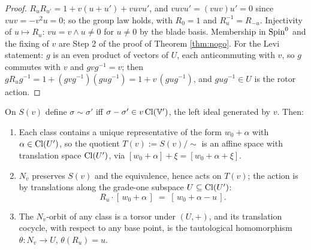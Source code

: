 \begin{proof}
$R_u R_{u'} = 1 + v(u + u') + vuvu'$, and $vuvu' = (vuv)u' = 0$ since $vuv = -v^2u = 0$; so the group law holds, with $R_0 = 1$ and $R_u^{-1} = R_{-u}$. Injectivity of $u \mapsto R_u$: $vu = v \wedge u \neq 0$ for $u \neq 0$ by the blade basis. Membership in $\mathrm{Spin}^0$ and the fixing of $v$ are Step 2 of the proof of Theorem \ref{thm:nogo}. For the Levi statement: $g$ is an even product of vectors of $U$, each anticommuting with $v$, so $g$ commutes with $v$ and $gvg^{-1} = v$; then $g R_u g^{-1} = 1 + (gvg^{-1})(gug^{-1}) = 1 + v\,(gug^{-1})$, and $gug^{-1} \in U$ is the rotor action.
\end{proof}

\begin{proposition}\label{prop:torsor}
On $S(v)$ define $\sigma \sim \sigma'$ iff $\sigma - \sigma' \in v\,\mathrm{Cl}(\mathbb{V}')$, the left ideal generated by $v$. Then:
\begin{enumerate}
\item Each class contains a unique representative of the form $w_0 + \alpha$ with $\alpha \in \mathrm{Cl}(U')$, so the quotient $T(v) := S(v)/\!\sim$ is an affine space with translation space $\mathrm{Cl}(U')$, via $[w_0 + \alpha] + \xi = [w_0 + \alpha + \xi]$.
\item $N_v$ preserves $S(v)$ and the equivalence, hence acts on $T(v)$; the action is by translations along the grade-one subspace $U \subseteq \mathrm{Cl}(U')$:
\[
R_u \cdot [\,w_0 + \alpha\,] \;=\; [\,w_0 + \alpha - u\,].
\]
\item The $N_v$-orbit of any class is a torsor under $(U, +)$, and its translation cocycle, with respect to any base point, is the tautological homomorphism $\theta : N_v \to U$, $\theta(R_u) = u$.
\end{enumerate}
\end{proposition}

